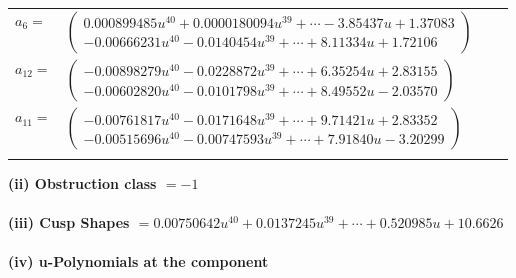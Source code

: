 \documentclass[1p]{elsarticle_modified}
\theoremstyle{definition}
\begin{document}
\begin{tabular}{m{7pt} m{180pt} m{7pt} m{180pt} }
\flushright $a_{6}=$&$\begin{pmatrix}0.000899485 u^{40}+0.0000180094 u^{39}+\cdots-3.85437 u+1.37083\\-0.00666231 u^{40}-0.0140454 u^{39}+\cdots+8.11334 u+1.72106\end{pmatrix}$ \\
\flushright $a_{12}=$&$\begin{pmatrix}-0.00898279 u^{40}-0.0228872 u^{39}+\cdots+6.35254 u+2.83155\\-0.00602820 u^{40}-0.0101798 u^{39}+\cdots+8.49552 u-2.03570\end{pmatrix}$ \\
\flushright $a_{11}=$&$\begin{pmatrix}-0.00761817 u^{40}-0.0171648 u^{39}+\cdots+9.71421 u+2.83352\\-0.00515696 u^{40}-0.00747593 u^{39}+\cdots+7.91840 u-3.20299\end{pmatrix}$\\&\end{tabular}
\flushleft \textbf{(ii) Obstruction class $= -1$}\\~\\
\flushleft \textbf{(iii) Cusp Shapes $= 0.00750642 u^{40}+0.0137245 u^{39}+\cdots+0.520985 u+10.6626$}\\~\\
\newpage\renewcommand{\arraystretch}{1}
\flushleft \textbf{(iv) u-Polynomials at the component}\newline \\
\end{document}
